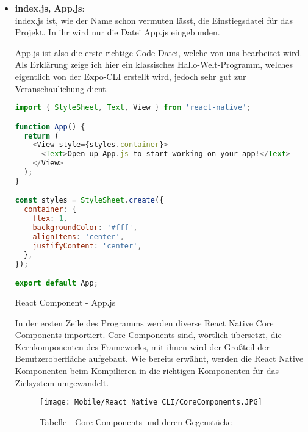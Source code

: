 \begin{itemize}
\item \textbf{index.js, App.js}:\\
index.js ist, wie der Name schon vermuten lässt, die Einstiegsdatei für das Projekt. In ihr wird
nur die Datei App.js eingebunden.

App.js ist also die erste richtige Code-Datei, welche von uns bearbeitet wird. Als Erklärung zeige
ich hier ein klassisches Hallo-Welt-Programm, welches eigentlich von der Expo-CLI erstellt wird,
jedoch sehr gut zur Veranschaulichung dient.

\begin{code}[htp]
\begin{lstlisting}[firstnumber=1,language=JavaScript, style=JSX]
import { StyleSheet, Text, View } from 'react-native';

function App() {
  return (
    <View style={styles.container}>
      <Text>Open up App.js to start working on your app!</Text>
    </View>
  );
}

const styles = StyleSheet.create({
  container: {
    flex: 1,
    backgroundColor: '#fff',
    alignItems: 'center',
    justifyContent: 'center',
  },
});

export default App;
\end{lstlisting}
\caption{React Component - App.js}
\end{code}

In der ersten Zeile des Programms werden diverse React Native Core Components importiert. Core
Components sind, wörtlich übersetzt, die Kernkomponenten des Frameworks, mit ihnen wird der Großteil
der Benutzeroberfläche aufgebaut. Wie bereits erwähnt, werden die React Native Komponenten beim
Kompilieren in die richtigen Komponenten für das Zielsystem umgewandelt.


\begin{figure}[H]
  \begin{center}
    \texttt{[image: Mobile/React Native CLI/CoreComponents.JPG]}
    \caption{Tabelle - Core Components und deren Gegenstücke \cite{reactNativeCoreComponents}}
  \end{center}
\end{figure}


\end{itemize}
